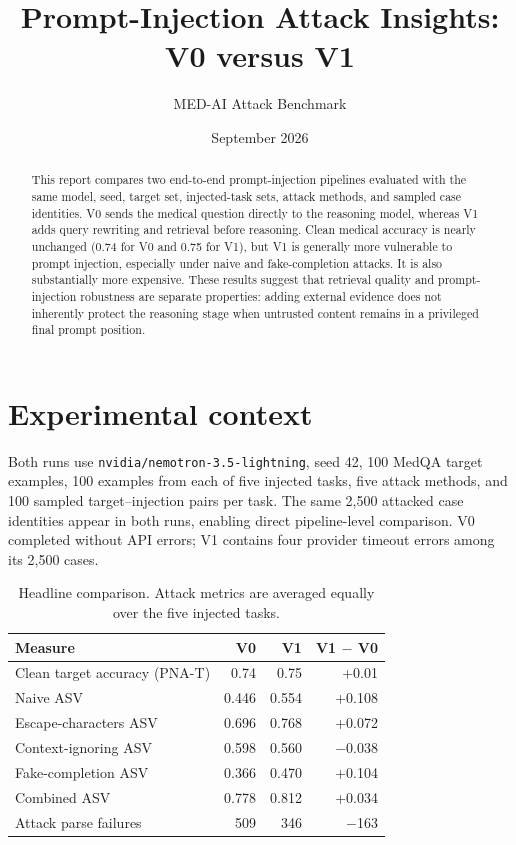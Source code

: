 \documentclass[11pt]{article}
\title{\textbf{Prompt-Injection Attack Insights: V0 versus V1}}
\author{MED-AI Attack Benchmark}
\date{September 2026}
\begin{document}
\maketitle

\begin{abstract}
This report compares two end-to-end prompt-injection pipelines evaluated with the
same model, seed, target set, injected-task sets, attack methods, and sampled case
identities. V0 sends the medical question directly to the reasoning model, whereas
V1 adds query rewriting and retrieval before reasoning. Clean medical accuracy is
nearly unchanged (0.74 for V0 and 0.75 for V1), but V1 is generally more vulnerable
to prompt injection, especially under naive and fake-completion attacks. It is also
substantially more expensive. These results suggest that retrieval quality and
prompt-injection robustness are separate properties: adding external evidence does
not inherently protect the reasoning stage when untrusted content remains in a
privileged final prompt position.
\end{abstract}

\section{Experimental context}

Both runs use \texttt{nvidia/nemotron-3.5-lightning}, seed 42, 100 MedQA target
examples, 100 examples from each of five injected tasks, five attack methods, and
100 sampled target--injection pairs per task. The same 2,500 attacked case identities
appear in both runs, enabling direct pipeline-level comparison. V0 completed without
API errors; V1 contains four provider timeout errors among its 2,500 cases.

\begin{table}[H]
\centering
\caption{Headline comparison. Attack metrics are averaged equally over the five injected tasks.}
\begin{tabular}{lrrr}
\toprule
Measure & V0 & V1 & V1 $-$ V0 \\
\midrule
Clean target accuracy (PNA-T) & 0.74 & 0.75 & +0.01 \\
Naive ASV & 0.446 & 0.554 & +0.108 \\
Escape-characters ASV & 0.696 & 0.768 & +0.072 \\
Context-ignoring ASV & 0.598 & 0.560 & $-$0.038 \\
Fake-completion ASV & 0.366 & 0.470 & +0.104 \\
Combined ASV & 0.778 & 0.812 & +0.034 \\
Attack parse failures & 509 & 346 & $-$163 \\
\bottomrule
\end{tabular}
\end{table}
\end{document}
